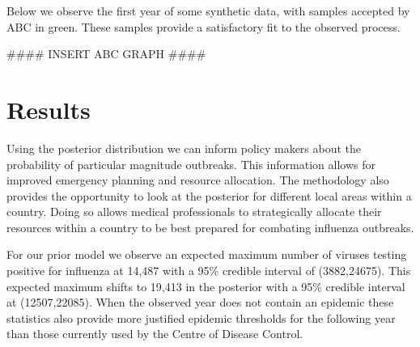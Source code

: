 \documentclass{article}
\begin{document}
Below we observe the first year of some synthetic data, with samples accepted by ABC in green. These samples provide a satisfactory fit to the observed process. 

#### INSERT ABC GRAPH ####

\section{Results}

Using the posterior distribution we can inform policy makers about the probability of particular magnitude outbreaks. This information allows for improved emergency planning and resource allocation. The methodology also provides the opportunity to look at the posterior for different local areas within a country. Doing so allows medical professionals to strategically allocate their resources within a country to be best prepared for combating influenza outbreaks. 

For our prior model we observe an expected maximum number of viruses testing positive for influenza at 14,487 with a 95\% credible interval of (3882,24675). This expected maximum shifts to 19,413 in the posterior with a 95\% credible interval at (12507,22085). When the observed year does not contain an epidemic these statistics also provide more justified epidemic thresholds for the following year than those currently used by the Centre of Disease Control. 
\end{document}
